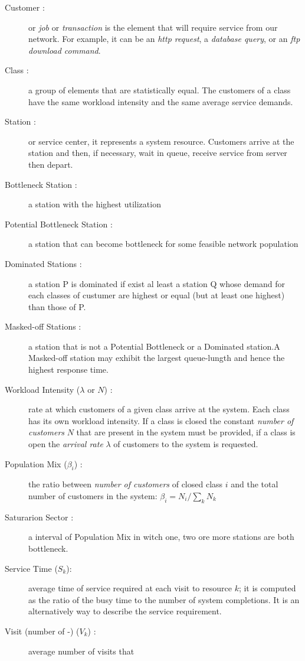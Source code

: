 \begin{description}
\item[Customer :] or \emph{job} or \emph{transaction} is the element that will require
service from our network. For example, it can be an \emph{http
request}, a \emph{database query}, or an \emph{ftp download
command}.
\item[Class :] a group of elements that are statistically equal.
The customers of a class have the same workload intensity and the
same average service demands.
\item[Station :] or service center, it represents a system resource.
Customers arrive at the station and then, if necessary, wait in
queue, receive service from server then depart.
\item[Bottleneck Station :] a station with the highest utilization
\item[Potential Bottleneck Station :] a station that can become bottleneck for some feasible network population
\item[Dominated Stations :] a station P is dominated if exist al least a station Q whose demand for each classes of custumer are highest or equal (but at least one highest) than those of P.
\item[Masked-off Stations :] a station that is not a Potential Bottleneck or a Dominated station.A Masked-off station may exhibit the largest queue-lungth and hence the highest response time.
\item[Workload Intensity ($\lambda$ or $N$) :] rate at which customers of a
given class arrive at the system.  Each class has its own workload
intensity. If a class is closed the constant \emph{number of
customers} $N$ that are present in the system must be provided, if a
class is open the \emph{arrival rate} $\lambda$ of customers to the
system is requested.
\item[Population Mix ($\beta_i$) :] the ratio between \emph{number of
customers} of closed class $i$ and the total number of customers in
the system: $\beta_i = N_i / \sum_k N_k$
\item[Saturarion Sector :] a interval of Population Mix in witch one, two ore more stations are both bottleneck.
\item[Service Time ($S_k$):] average time of service required at
each visit to resource $k$; it is computed as the ratio of the busy
time to the number of system completions. It is an alternatively way
to describe the service requirement.
\item[Visit (number of -) ($V_k$) :] average number of visits that

\end{description}
